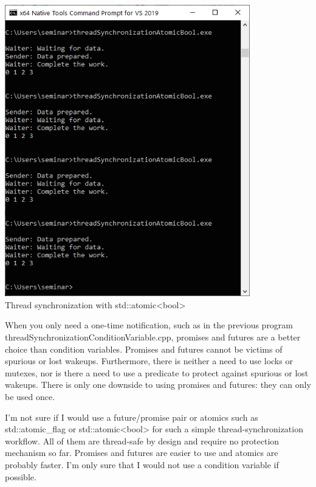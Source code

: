 \begin{center}
\includegraphics[width=0.8\textwidth]{content/3/chapter6/images/14.png}\\
Thread synchronization with std::atomic<bool>
\end{center}

\begin{tcolorbox}[colback=blue!5!white,colframe=blue!75!black,title={Condition Variables versus Promise/Future Pairs versus std::atomic\_flag}]
	
When you only need a one-time notification, such as in the previous program threadSynchronizationConditionVariable.cpp, promises and futures are a better choice than condition variables. Promises and futures cannot be victims of spurious or lost wakeups.
Furthermore, there is neither a need to use locks or mutexes, nor is there a need to use a predicate to protect against spurious or lost wakeups. There is only one downside to using promises and futures: they can only be used once.


I’m not sure if I would use a future/promise pair or atomics such as std::atomic\_flag or std::atomic<bool> for such a simple thread-synchronization workflow. All of them are thread-safe by design and require no protection mechanism so far. Promises and futures are easier to use and atomics are probably faster. I’m only sure that I would not use a condition variable if possible.
	
\end{tcolorbox}


